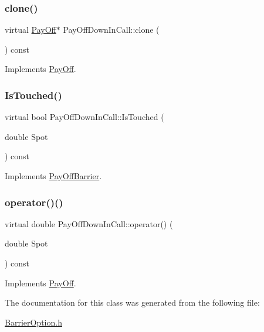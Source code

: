 \subsubsection{\texorpdfstring{clone()}{clone()}}
{\footnotesize\ttfamily virtual \hyperlink{classPayOff}{Pay\+Off}$\ast$ Pay\+Off\+Down\+In\+Call\+::clone (\begin{DoxyParamCaption}{ }\end{DoxyParamCaption}) const\hspace{0.3cm}{\ttfamily [virtual]}}



Implements \hyperlink{classPayOff_ad8194d5b82247ae89c25c515f0ba806a}{Pay\+Off}.

\hypertarget{classPayOffDownInCall_a2be6d6571ea7969db355d39980326def}{}\label{classPayOffDownInCall_a2be6d6571ea7969db355d39980326def} 
\subsubsection{\texorpdfstring{Is\+Touched()}{IsTouched()}}
{\footnotesize\ttfamily virtual bool Pay\+Off\+Down\+In\+Call\+::\+Is\+Touched (\begin{DoxyParamCaption}\item[{double}]{Spot }\end{DoxyParamCaption}) const\hspace{0.3cm}{\ttfamily [virtual]}}



Implements \hyperlink{classPayOffBarrier_a2aa9162c618c4f72a6593dc625e1e1e8}{Pay\+Off\+Barrier}.

\hypertarget{classPayOffDownInCall_a606871776edae20190b3b0b4ce822dcc}{}\label{classPayOffDownInCall_a606871776edae20190b3b0b4ce822dcc} 
\subsubsection{\texorpdfstring{operator()()}{operator()()}}
{\footnotesize\ttfamily virtual double Pay\+Off\+Down\+In\+Call\+::operator() (\begin{DoxyParamCaption}\item[{double}]{Spot }\end{DoxyParamCaption}) const\hspace{0.3cm}{\ttfamily [virtual]}}



Implements \hyperlink{classPayOff_a5ae17d82c233ef5568c8fb0539703000}{Pay\+Off}.



The documentation for this class was generated from the following file\+:\begin{DoxyCompactItemize}
\item 
\hyperlink{BarrierOption_8h}{Barrier\+Option.\+h}\end{DoxyCompactItemize}

